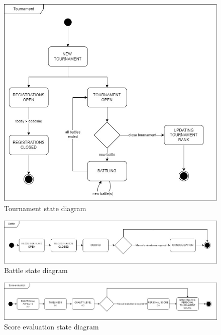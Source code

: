 \begin{figure}[H]
    \centering
    \includegraphics[width=.8\textwidth]{state_diagrams/tournament.jpg}
    \caption{Tournament state diagram}
    \label{fig:tournament-state-diagram}
\end{figure}
\begin{figure}[H]
    \centering
    \includegraphics[width=1\textwidth]{state_diagrams/battle.jpg}
    \caption{Battle state diagram}
    \label{fig:battle-state-diagram}
\end{figure}
\begin{figure}[H]
    \centering
    \includegraphics[width=1\textwidth]{state_diagrams/score_evaluation.jpg}
    \caption{Score evaluation state diagram}
    \label{fig:score-evaluation-state-diagram}
\end{figure}


